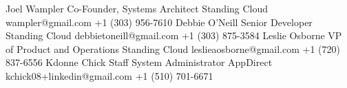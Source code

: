 
\begin{referees}
  \newline
		{Joel Wampler}
		{Co-Founder, Systems Architect}
		{Standing Cloud}
		{wampler@gmail.com}
    {+1 (303) 956-7610}
  \newline
    {Debbie O'Neill}
    {Senior Developer}
    {Standing Cloud}
    {debbietoneill@gmail.com}
    {+1 (303) 875-3584}
  \newline
    {Leslie Osborne}
    {VP of Product and Operations}
    {Standing Cloud}
    {leslieaosborne@gmail.com}
    {+1 (720) 837-6556}
  \newline
    {Kdonne Chick}
    {Staff System Administrator}
    {AppDirect}
    {kchick08+linkedin@gmail.com}
    {+1 (510) 701-6671}
\end{referees}
